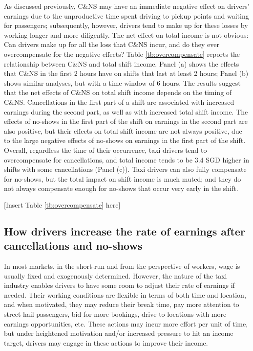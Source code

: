 \documentclass[reviewmode]{restud}
\begin{document}
As discussed previously, C\&NS may have an immediate negative effect on drivers' earnings due to the unproductive time spent driving to pickup points and waiting for passengers; subsequently, however, drivers tend to make up for these losses by working longer and more diligently. The net effect on total income is not obvious: Can drivers make up for all the loss that C\&NS incur, and do they ever overcompensate for the negative effects? Table \ref{tb:overcompensate} reports the relationship between C\&NS and total shift income. Panel (a) shows the effects that C\&NS in the first 2 hours have on shifts that last at least 2 hours; Panel (b) shows similar analyses, but with a time window of 6 hours. The results suggest that the net effects of C\&NS on total shift income depends on the timing of C\&NS. Cancellations in the first part of a shift are associated with increased earnings during the second part, as well as with increased total shift income. The effects of no-shows in the first part of the shift on earnings in the second part are also positive, but their effects on total shift income are not always positive, due to the large negative effects of no-shows on earnings in the first part of the shift. Overall, regardless the time of their occurrence, taxi drivers tend to overcompensate for cancellations, and total income tends to be 3.4 SGD higher in shifts with some cancellations (Panel (c)). Taxi drivers can also fully compensate for no-shows, but the total impact on shift income is much muted; and they do not always compensate enough for no-shows that  occur very early in the shift. 

\begin{center}
	[Insert Table \ref{tb:overcompensate} here]
\end{center}

\subsection{How drivers increase the rate of earnings after cancellations and no-shows}
In most markets, in the short-run and from the perspective of workers, wage is usually fixed and exogenously determined. However, the nature of the taxi industry enables drivers to have some room to adjust their rate of earnings if needed. Their working conditions are flexible in terms of both time and location, and when motivated, they may reduce their break time, pay more attention to street-hail passengers, bid for more bookings, drive to locations with more earnings opportunities, etc. These actions may incur more effort per unit of time, but under heightened motivation and/or increased pressure to hit an income target, drivers may engage in these actions to improve their income.
\end{document}
